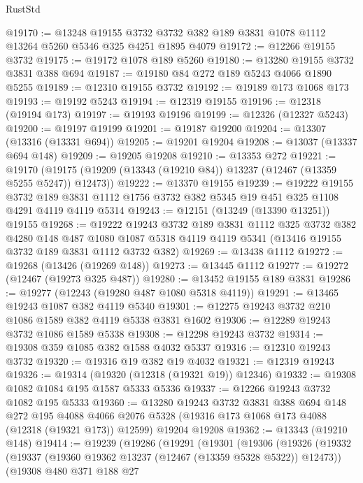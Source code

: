 \begin{lexlean}{RustStd}
\begin{coremodule}
@19170 := @13248
    @19155
    @3732
    @3732
    @382
    @189
    @3831
    @1078
    @1112
    @13264
    @5260
    @5346
    @325
    @4251
    @1895
    @4079
@19172 := @12266 @19155 @3732
@19175 := @19172 @1078 @189 @5260
@19180 := @13280 @19155 @3732 @3831 @388 @694
@19187 := @19180 @84 @272 @189 @5243 @4066 @1890 @5255
@19189 := @12310 @19155 @3732
@19192 := @19189 @173 @1068 @173
@19193 := @19192 @5243
@19194 := @12319 @19155
@19196 := @12318 (@19194 @173)
@19197 := @19193 @19196
@19199 := @12326 (@12327 @5243)
@19200 := @19197 @19199
@19201 := @19187 @19200
@19204 := @13307 (@13316 (@13331 @694))
@19205 := @19201 @19204
@19208 := @13037 (@13337 @694 @148)
@19209 := @19205 @19208
@19210 := @13353 @272
@19221 := @19170 (@19175 (@19209 (@13343 (@19210 @84)) @13237 (@12467 (@13359 @5255 @5247)) @12473))
@19222 := @13370 @19155
@19239 := @19222
    @19155
    @3732
    @189
    @3831
    @1112
    @1756
    @3732
    @382
    @5345
    @19
    @451
    @325
    @1108
    @4291
    @4119
    @4119
    @5314
@19243 := @12151 (@13249 (@13390 @13251)) @19155
@19268 := @19222
    @19243
    @3732
    @189
    @3831
    @1112
    @325
    @3732
    @382
    @4280
    @148
    @487
    @1080
    @1087
    @5318
    @4119
    @4119
    @5341
    (@13416 @19155 @3732 @189 @3831 @1112 @3732 @382)
@19269 := @13438 @1112
@19272 := @19268 (@13426 (@19269 @148))
@19273 := @13445 @1112
@19277 := @19272 (@12467 (@19273 @325 @487))
@19280 := @13452 @19155 @189 @3831
@19286 := @19277 (@12243 (@19280 @487 @1080 @5318 @4119))
@19291 := @13465 @19243 @1087 @382 @4119 @5340
@19301 := @12275 @19243 @3732 @210 @1086 @1589 @382 @4119 @5338 @3831 @1602
@19306 := @12289 @19243 @3732 @1086 @1589 @5338
@19308 := @12298 @19243 @3732
@19314 := @19308 @359 @1085 @382 @1588 @4032 @5337
@19316 := @12310 @19243 @3732
@19320 := @19316 @19 @382 @19 @4032
@19321 := @12319 @19243
@19326 := @19314 (@19320 (@12318 (@19321 @19)) @12346)
@19332 := @19308 @1082 @1084 @195 @1587 @5333 @5336
@19337 := @12266 @19243 @3732 @1082 @195 @5333
@19360 := @13280
    @19243
    @3732
    @3831
    @388
    @694
    @148
    @272
    @195
    @4088
    @4066
    @2076
    @5328
    (@19316 @173 @1068 @173 @4088 (@12318 (@19321 @173)) @12599)
    @19204
    @19208
@19362 := @13343 (@19210 @148)
@19414 := @19239
    (@19286
      (@19291
        (@19301
          (@19306
            (@19326
              (@19332
                (@19337 (@19360 @19362 @13237 (@12467 (@13359 @5328 @5322)) @12473))
                (@19308
                  @480
                  @371
                  @188
                  @27

\end{coremodule}
\end{lexlean}
